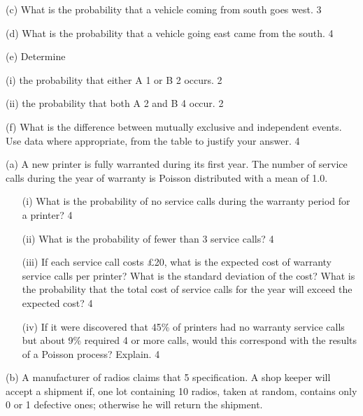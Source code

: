 (c) What is the probability that a vehicle coming from south goes west. 	3 
 
(d) What is the probability that a vehicle going east came from the south. 	4 
 
(e) Determine 
 
  (i) the probability that either A 1 or B 2 occurs. 				2 
 
 (ii) the probability that both A 2 and B 4 occur. 				2 
 
 (f)  What is the difference between mutually exclusive and independent events.  Use data  where appropriate, from the table to justify your answer. 4
 
 

(a) A new printer is fully warranted during its first year. The number of service calls  during the year of warranty is Poisson distributed with a mean of 1.0. 
 
\begin{itemize} 
\item[(i)] What is the probability of no service calls during the warranty period for a printer?                                                                                                            4 
 
\item[(ii)] What is the probability of fewer than 3 service calls? 			4 
 
\item[(iii)] If each service call costs £20, what is the expected cost of warranty service calls per  printer? What is the standard deviation of the cost? What is the probability that the  total cost of service calls for the year will exceed the expected cost? 											4 
 
 
\item[(iv)] If it were discovered that 45\% of printers had no warranty service calls but about 9\%   required 4 or more calls, would this correspond with the results of a Poisson process?  Explain. 								4 
\end{itemize}
 
(b) A manufacturer of radios claims that 5%
  specification. A shop keeper will accept a shipment if, one lot containing 10 radios, taken at random, contains only 0 or 1 defective ones; otherwise he will return the shipment. 
 
